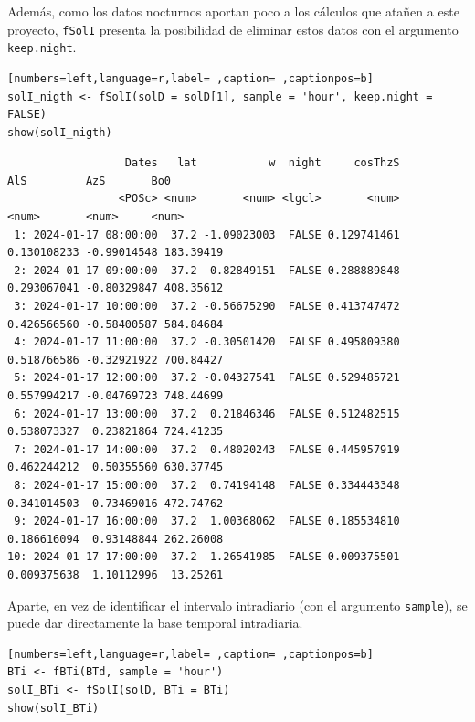 Además, como los datos nocturnos aportan poco a los cálculos que atañen a este proyecto, \texttt{fSolI} presenta la posibilidad de eliminar estos datos con el argumento \texttt{keep.night}.
\begin{lstlisting}[numbers=left,language=r,label= ,caption= ,captionpos=b]
solI_nigth <- fSolI(solD = solD[1], sample = 'hour', keep.night = FALSE)
show(solI_nigth)
\end{lstlisting}

\begin{verbatim}
                  Dates   lat           w  night     cosThzS         AlS         AzS       Bo0
                 <POSc> <num>       <num> <lgcl>       <num>       <num>       <num>     <num>
 1: 2024-01-17 08:00:00  37.2 -1.09023003  FALSE 0.129741461 0.130108233 -0.99014548 183.39419
 2: 2024-01-17 09:00:00  37.2 -0.82849151  FALSE 0.288889848 0.293067041 -0.80329847 408.35612
 3: 2024-01-17 10:00:00  37.2 -0.56675290  FALSE 0.413747472 0.426566560 -0.58400587 584.84684
 4: 2024-01-17 11:00:00  37.2 -0.30501420  FALSE 0.495809380 0.518766586 -0.32921922 700.84427
 5: 2024-01-17 12:00:00  37.2 -0.04327541  FALSE 0.529485721 0.557994217 -0.04769723 748.44699
 6: 2024-01-17 13:00:00  37.2  0.21846346  FALSE 0.512482515 0.538073327  0.23821864 724.41235
 7: 2024-01-17 14:00:00  37.2  0.48020243  FALSE 0.445957919 0.462244212  0.50355560 630.37745
 8: 2024-01-17 15:00:00  37.2  0.74194148  FALSE 0.334443348 0.341014503  0.73469016 472.74762
 9: 2024-01-17 16:00:00  37.2  1.00368062  FALSE 0.185534810 0.186616094  0.93148844 262.26008
10: 2024-01-17 17:00:00  37.2  1.26541985  FALSE 0.009375501 0.009375638  1.10112996  13.25261
\end{verbatim}

Aparte, en vez de identificar el intervalo intradiario (con el argumento \texttt{sample}), se puede dar directamente la base temporal intradiaria.
\begin{lstlisting}[numbers=left,language=r,label= ,caption= ,captionpos=b]
BTi <- fBTi(BTd, sample = 'hour')
solI_BTi <- fSolI(solD, BTi = BTi)
show(solI_BTi)
\end{lstlisting}

